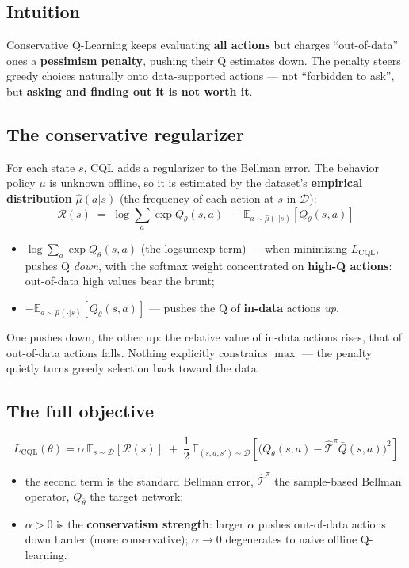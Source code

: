 \documentclass{article}
\begin{document}
\subsection*{Intuition}

Conservative Q-Learning keeps evaluating \textbf{all actions} but charges ``out-of-data'' ones a \textbf{pessimism penalty}, pushing their Q estimates down. The penalty steers greedy choices naturally onto data-supported actions --- not ``forbidden to ask'', but \textbf{asking and finding out it is not worth it}.

\subsection*{The conservative regularizer}

For each state $s$, CQL adds a regularizer to the Bellman error. The behavior policy $\mu$ is unknown offline, so it is estimated by the dataset's \textbf{empirical distribution} $\hat\mu(a|s)$ (the frequency of each action at $s$ in $\mathcal{D}$):
\[
\boxed{\mathcal{R}(s) \;=\; \log\sum_{a}\exp Q_\theta(s,a) \;-\; \mathbb{E}_{a\sim\hat\mu(\cdot|s)}\!\left[Q_\theta(s,a)\right]}
\]

\begin{itemize}
  \item $\log\sum_a\exp Q_\theta(s,a)$ (the logsumexp term) --- when minimizing $L_\text{CQL}$, pushes Q \emph{down}, with the softmax weight concentrated on \textbf{high-Q actions}: out-of-data high values bear the brunt;
  \item $-\mathbb{E}_{a\sim\hat\mu(\cdot|s)}[Q_\theta(s,a)]$ --- pushes the Q of \textbf{in-data} actions \emph{up}.
\end{itemize}

One pushes down, the other up: the relative value of in-data actions rises, that of out-of-data actions falls. Nothing explicitly constrains $\max$ --- the penalty quietly turns greedy selection back toward the data.

\subsection*{The full objective}

\[
\boxed{L_\text{CQL}(\theta) = \alpha\,\mathbb{E}_{s\sim\mathcal{D}}\!\left[\mathcal{R}(s)\right] \;+\; \frac{1}{2}\,\mathbb{E}_{(s,a,s')\sim\mathcal{D}}\!\left[\bigl(Q_\theta(s,a) - \hat{\mathcal{T}}^\pi \bar Q(s,a)\bigr)^2\right]}
\]

\begin{itemize}
  \item the second term is the standard Bellman error, $\hat{\mathcal{T}}^\pi$ the sample-based Bellman operator, $Q_{\bar\theta}$ the target network;
  \item $\alpha > 0$ is the \textbf{conservatism strength}: larger $\alpha$ pushes out-of-data actions down harder (more conservative); $\alpha \to 0$ degenerates to naive offline Q-learning.
\end{itemize}
\end{document}
